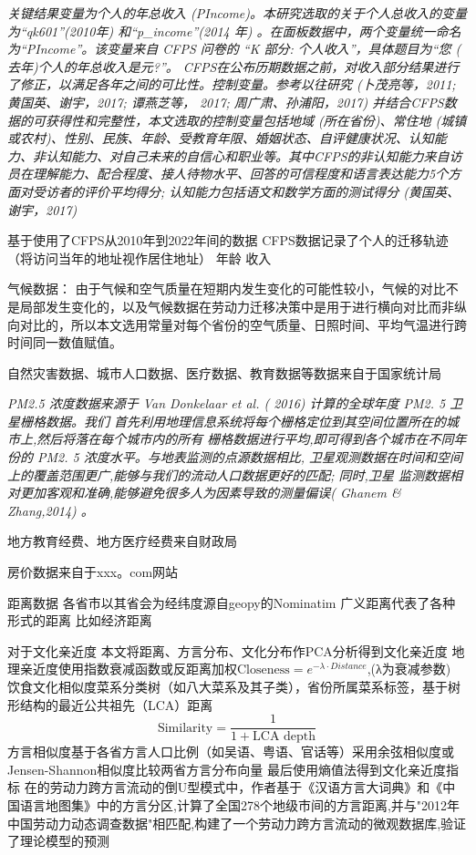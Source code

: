 \documentclass[a4paper,12pt]{article}
\begin{document}
\textit{关键结果变量为个人的年总收入 (PIncome)。本研究选取的关于个人总收入的变量为“qk601”(2010年) 和“p\_income”(2014 年) 。在面板数据中，两个变量统一命名为“PIncome”。该变量来自 CFPS 问卷的 “K 部分: 个人收入”，具体题目为“您 ( 去年)个人的年总收入是元?”。
CFPS在公布历期数据之前，对收入部分结果进行了修正，以满足各年之间的可比性。控制变量。参考以往研究 (卜茂亮等，2011; 黄国英、谢宇，2017; 谭燕芝等， 2017; 周广肃、孙浦阳，2017) 并结合CFPS数据的可获得性和完整性，本文选取的控制变量包括地域 (所在省份)、常住地 (城镇或农村)、性别、民族、年龄、受教育年限、婚姻状态、自评健康状况、认知能力、非认知能力、对自己未来的自信心和职业等。其中CFPS的非认知能力来自访员在理解能力、配合程度、接人待物水平、回答的可信程度和语言表达能力5个方面对受访者的评价平均得分; 认知能力包括语文和数学方面的测试得分 (黄国英、谢宇，2017)}


基于使用了CFPS从2010年到2022年间的数据
CFPS数据记录了个人的迁移轨迹（将访问当年的地址视作居住地址）
年龄
收入

气候数据：
由于气候和空气质量在短期内发生变化的可能性较小，气候的对比不是局部发生变化的，以及气候数据在劳动力迁移决策中是用于进行横向对比而非纵向对比的，所以本文选用常量对每个省份的空气质量、日照时间、平均气温进行跨时间同一数值赋值。



自然灾害数据、城市人口数据、医疗数据、教育数据等数据来自于国家统计局

\textit{PM2.5 浓度数据来源于 Van Donkelaar et al. ( 2016) 计算的全球年度 PM2. 5 卫星栅格数据。我们 首先利用地理信息系统将每个栅格定位到其空间位置所在的城市上,然后将落在每个城市内的所有 栅格数据进行平均,即可得到各个城市在不同年份的 PM2. 5 浓度水平。与地表监测的点源数据相比, 卫星观测数据在时间和空间上的覆盖范围更广,能够与我们的流动人口数据更好的匹配; 同时,卫星 监测数据相对更加客观和准确,能够避免很多人为因素导致的测量偏误( Ghanem \& Zhang,2014) 。}


地方教育经费、地方医疗经费来自财政局

房价数据来自于xxx。com网站

距离数据
各省市以其省会为经纬度源自geopy的Nominatim
广义距离代表了各种形式的距离 比如经济距离

对于文化亲近度
本文将距离、方言分布、文化分布作PCA分析得到文化亲近度
地理亲近度使用指数衰减函数或反距离加权$\text{Closeness}=e^ {-\lambda \cdot Distance}$,(λ为衰减参数)
饮食文化相似度菜系分类树（如八大菜系及其子类），省份所属菜系标签，基于树形结构的最近公共祖先（LCA）距离
\begin{equation}
  \text{Similarity}=\frac{1}{1+\text{LCA depth}}
\end{equation}
方言相似度基于各省方言人口比例（如吴语、粤语、官话等）采用余弦相似度或Jensen-Shannon相似度比较两省方言分布向量
最后使用熵值法得到文化亲近度指标
在\cite{LiuYuYunLaoDongLiKuaFangYanLiuDongDeDaoUXingMoShi2015}的劳动力跨方言流动的倒U型模式中，作者基于《汉语方言大词典》和《中国语言地图集》中的方言分区,计算了全国278个地级市间的方言距离,并与"2012年中国劳动力动态调查数据"相匹配,构建了一个劳动力跨方言流动的微观数据库,验证了理论模型的预测
\end{document}
